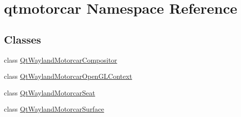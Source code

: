 \hypertarget{namespaceqtmotorcar}{\section{qtmotorcar Namespace Reference}
\label{namespaceqtmotorcar}
}
\subsection*{Classes}
\begin{DoxyCompactItemize}
\item 
class \hyperlink{classqtmotorcar_1_1QtWaylandMotorcarCompositor}{Qt\-Wayland\-Motorcar\-Compositor}
\item 
class \hyperlink{classqtmotorcar_1_1QtWaylandMotorcarOpenGLContext}{Qt\-Wayland\-Motorcar\-Open\-G\-L\-Context}
\item 
class \hyperlink{classqtmotorcar_1_1QtWaylandMotorcarSeat}{Qt\-Wayland\-Motorcar\-Seat}
\item 
class \hyperlink{classqtmotorcar_1_1QtWaylandMotorcarSurface}{Qt\-Wayland\-Motorcar\-Surface}
\end{DoxyCompactItemize}
